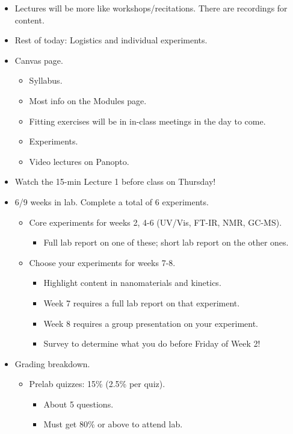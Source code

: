 \documentclass[../notes.tex]{subfiles}
\begin{document}
\begin{itemize}
    \item Lectures will be more like workshops/recitations. There are recordings for content.
    \item Rest of today: Logistics and individual experiments.
    \item Canvas page.
    \begin{itemize}
        \item Syllabus.
        \item Most info on the Modules page.
        \item Fitting exercises will be in in-class meetings in the day to come.
        \item Experiments.
        \item Video lectures on Panopto.
    \end{itemize}
    \item Watch the 15-min Lecture 1 before class on Thursday!
    \item 6/9 weeks in lab. Complete a total of 6 experiments.
    \begin{itemize}
        \item Core experiments for weeks 2, 4-6 (UV/Vis, FT-IR, NMR, GC-MS).
        \begin{itemize}
            \item Full lab report on one of these; short lab report on the other ones.
        \end{itemize}
        \item Choose your experiments for weeks 7-8.
        \begin{itemize}
            \item Highlight content in nanomaterials and kinetics.
            \item Week 7 requires a full lab report on that experiment.
            \item Week 8 requires a group presentation on your experiment.
            \item Survey to determine what you do before Friday of Week 2!
        \end{itemize}
    \end{itemize}
    \item Grading breakdown.
    \begin{itemize}
        \item Prelab quizzes: 15\% (2.5\% per quiz).
        \begin{itemize}
            \item About 5 questions.
            \item Must get 80\% or above to attend lab.

\end{itemize}
\end{itemize}
\end{itemize}
\end{document}

